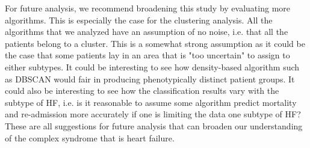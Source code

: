 \documentclass[../thesis.tex]{subfiles}
\begin{document}
\indent For future analysis, we recommend broadening this study by evaluating more algorithms. This is especially the case for the clustering analysis. All the algorithms that we analyzed have an assumption of no noise, i.e. that all the patients belong to a cluster. This is a somewhat strong assumption as it could be the case that some patients lay in an area that is "too uncertain" to assign to either subtypes. It could be interesting to see how density-based algorithm such as DBSCAN \citep{ester1996density} would fair in producing phenotypically distinct patient groups. It could also be interesting to see how the classification results vary with the subtype of HF, i.e. is it reasonable to assume some algorithm predict mortality and re-admission more accurately if one is limiting the data one subtype of HF? These are all suggestions for future analysis that can broaden our understanding of the complex syndrome that is heart failure. 
\end{document}
